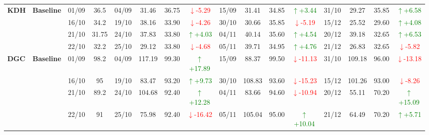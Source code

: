 \documentclass{ieeeaccess}
\begin{document}
{\begin{longtable}{llcc|cccc|cccc|cccc}
\multirow{4}{*}{\textbf{KDH}}
& \textbf{Baseline}
& 01/09 & 36.5 & 04/09 & 31.46 & 36.75 & \textcolor{red}{\(\downarrow\)-5.29} & 15/09 & 31.41 & 34.85 & \textcolor{green}{\(\uparrow\)+3.44} & 31/10 & 29.27 & 35.85 & \textcolor{green}{\(\uparrow\)+6.58} \\
& & 16/10 & 34.2 & 19/10 & 38.16 & 33.90 & \textcolor{red}{\(\downarrow\)-4.26} & 30/10 & 30.66 & 35.85 & \textcolor{red}{\(\downarrow\)-5.19} & 15/12 & 25.52 & 29.60 & \textcolor{green}{\(\uparrow\)+4.08} \\
& & 21/10 & 31.75 & 24/10 & 37.83 & 33.80 & \textcolor{green}{\(\uparrow\)+4.03} & 04/11 & 40.14 & 35.60 & \textcolor{green}{\(\uparrow\)+4.54} & 20/12 & 39.18 & 32.65 & \textcolor{green}{\(\uparrow\)+6.53} \\
& & 22/10 & 32.2 & 25/10 & 29.12 & 33.80 & \textcolor{red}{\(\downarrow\)-4.68} & 05/11 & 39.71 & 34.95 & \textcolor{green}{\(\uparrow\)+4.76} & 21/12 & 26.83 & 32.65 & \textcolor{red}{\(\downarrow\)-5.82} \\
\midrule

\multirow{4}{*}{\textbf{DGC}}
& \textbf{Baseline}
& 01/09 & 98.2 & 04/09 & 117.19 & 99.30 & \textcolor{green}{\(\uparrow\)+17.89} & 15/09 & 88.37 & 99.50 & \textcolor{red}{\(\downarrow\)-11.13} & 31/10 & 109.18 & 96.00 & \textcolor{red}{\(\downarrow\)-13.18} \\
& & 16/10 & 95 & 19/10 & 83.47 & 93.20 & \textcolor{green}{\(\uparrow\)+9.73} & 30/10 & 108.83 & 93.60 & \textcolor{red}{\(\downarrow\)-15.23} & 15/12 & 101.26 & 93.00 & \textcolor{red}{\(\downarrow\)-8.26} \\
& & 21/10 & 89.2 & 24/10 & 104.68 & 92.40 & \textcolor{green}{\(\uparrow\)+12.28} & 04/11 & 83.66 & 94.60 & \textcolor{red}{\(\downarrow\)-10.94} & 20/12 & 55.11 & 70.20 & \textcolor{green}{\(\uparrow\)+15.09} \\
& & 22/10 & 91 & 25/10 & 75.98 & 92.40 & \textcolor{red}{\(\downarrow\)-16.42} & 05/11 & 105.04 & 95.00 & \textcolor{green}{\(\uparrow\)+10.04} & 21/12 & 64.49 & 70.20 & \textcolor{green}{\(\uparrow\)+5.71} \\
\midrule


\end{longtable}}
\end{document}
